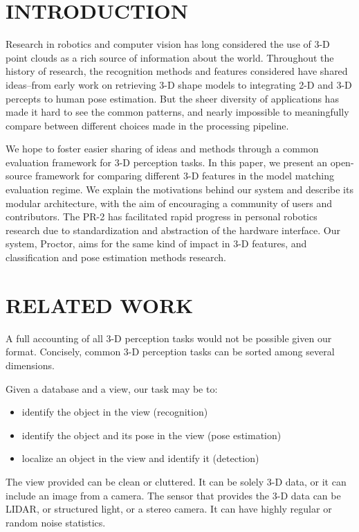 \section{INTRODUCTION}
Research in robotics and computer vision has long considered the use of 3-D point clouds as a rich source of information about the world.
Throughout the history of research, the recognition methods and features considered have shared ideas--from early work on retrieving 3-D shape models to integrating 2-D and 3-D percepts to human pose estimation.
But the sheer diversity of applications has made it hard to see the common patterns, and nearly impossible to meaningfully compare between different choices made in the processing pipeline.

We hope to foster easier sharing of ideas and methods through a common evaluation framework for 3-D perception tasks.
In this paper, we present an open-source framework for comparing different 3-D features in the model matching evaluation regime.
We explain the motivations behind our system and describe its modular architecture, with the aim of encouraging a community of users and contributors.
The PR-2  has facilitated rapid progress in personal robotics research due to standardization and abstraction of the hardware interface.
Our system, Proctor, aims for the same kind of impact in 3-D features, and classification and pose estimation methods research.

\section{RELATED WORK}

A full accounting of all 3-D perception tasks would not be possible given our format.
Concisely, common 3-D perception tasks can be sorted among several dimensions.

Given a database and a view, our task may be to:
\begin{itemize}
\item identify the object in the view (recognition)
\item identify the object and its pose in the view (pose estimation)
\item localize an object in the view and identify it (detection)
\end{itemize}

The view provided can be clean or cluttered.
It can be solely 3-D data, or it can include an image from a camera.
The sensor that provides the 3-D data can be LIDAR, or structured light, or a stereo camera.
It can have highly regular or random noise statistics.

